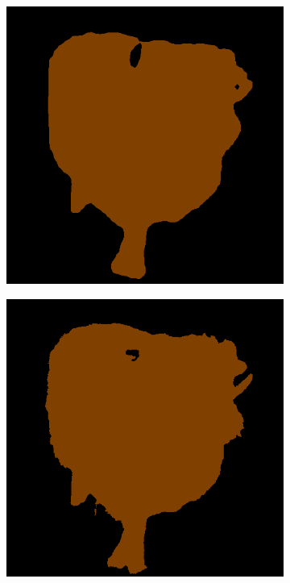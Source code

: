 \documentclass{article} %
\begin{document}
\begin{figure}[t]
\begin{subfigure}[b]{0.19\linewidth}
  \end{subfigure}
  \begin{subfigure}[b]{0.19\linewidth}
    \includegraphics[width=\textwidth]{figs/ab/context/2009_001991}
  \end{subfigure}
  \begin{subfigure}[b]{0.19\linewidth}
    \includegraphics[width=\textwidth]{figs/ab/crf/2009_001991}

\end{subfigure}
\end{figure}
\end{document}
